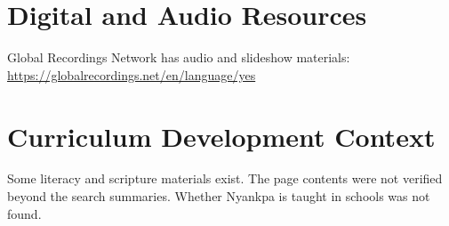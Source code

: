 \documentclass[12pt]{article}
\begin{document}
\section{Digital and Audio Resources}
Global Recordings Network has audio and slideshow materials: \url{https://globalrecordings.net/en/language/yes}

\section{Curriculum Development Context}
Some literacy and scripture materials exist. The page contents were not verified beyond the search summaries. Whether Nyankpa is taught in schools was not found.
\end{document}
